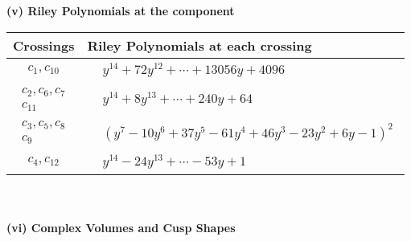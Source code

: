 \documentclass[1p]{elsarticle_modified}
\theoremstyle{definition}
\begin{document}
\newpage\renewcommand{\arraystretch}{1}
\flushleft \textbf{(v) Riley Polynomials at the component}\newline \\
\begin{tabular}{m{50pt}|m{274pt}}
Crossings & \hspace{64pt}Riley Polynomials at each crossing \\
\hline $$\begin{aligned}c_{1},c_{10}\end{aligned}$$&$\begin{aligned}
&y^{14}+72 y^{12}+\cdots+13056 y+4096
\end{aligned}$\\
\hline $$\begin{aligned}c_{2},c_{6},c_{7}\\c_{11}\end{aligned}$$&$\begin{aligned}
&y^{14}+8 y^{13}+\cdots+240 y+64
\end{aligned}$\\
\hline $$\begin{aligned}c_{3},c_{5},c_{8}\\c_{9}\end{aligned}$$&$\begin{aligned}
&(y^7-10 y^6+37 y^5-61 y^4+46 y^3-23 y^2+6 y-1)^2
\end{aligned}$\\
\hline $$\begin{aligned}c_{4},c_{12}\end{aligned}$$&$\begin{aligned}
&y^{14}-24 y^{13}+\cdots-53 y+1
\end{aligned}$\\
\hline
\end{tabular}\\~\\
\newpage\flushleft \textbf{(vi) Complex Volumes and Cusp Shapes}
\end{document}
